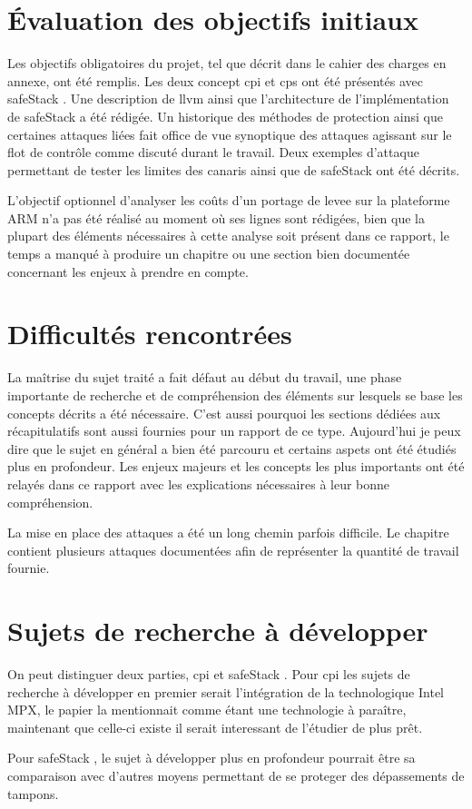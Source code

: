\section{Évaluation des objectifs initiaux}

Les objectifs obligatoires du projet, tel que décrit dans le cahier des charges en
annexe, ont été remplis. Les deux concept \gls{cpi} et \gls{cps} ont été présentés
avec \og \gls{safeStack} \fg. Une description de \gls{llvm} ainsi que l'architecture
de l'implémentation de \og \gls{safeStack} \fg a été rédigée. Un historique des
méthodes de protection ainsi que certaines attaques liées fait office de vue
synoptique des attaques agissant sur le flot de contrôle comme discuté durant
le travail. Deux exemples d'attaque permettant de tester les limites des canaris
ainsi que de \og \gls{safeStack} \fg ont été décrits.

L'objectif optionnel d'analyser les coûts d'un portage de \gls{levee} sur la plateforme
ARM n'a pas été réalisé au moment où ses lignes sont rédigées, bien que la plupart
des éléments nécessaires à cette analyse soit présent dans ce rapport, le temps
a manqué à produire un chapitre ou une section bien documentée concernant les
enjeux à prendre en compte.

\section{Difficultés rencontrées}

La maîtrise du sujet traité a fait défaut au début du travail, une phase importante
de recherche et de compréhension des éléments sur lesquels se base les
concepts décrits a été nécessaire. C'est aussi pourquoi les sections dédiées aux
récapitulatifs sont aussi fournies pour un rapport de ce type. Aujourd'hui je peux
dire que le sujet en général a bien été parcouru et certains aspets ont été
étudiés plus en profondeur. Les enjeux majeurs et les concepts les plus importants
ont été relayés dans ce rapport avec les explications nécessaires à leur bonne
compréhension.

La mise en place des attaques a été un long chemin parfois difficile. Le chapitre
contient plusieurs attaques documentées afin de représenter la quantité de travail
fournie.

\section{Sujets de recherche à développer}

On peut distinguer deux parties, \gls{cpi} et \og \gls{safeStack} \fg.
Pour \gls{cpi} les sujets de recherche à développer en premier serait l'intégration
de la technologique Intel MPX, le papier la mentionnait comme étant une technologie
à paraître, maintenant que celle-ci existe il serait interessant de l'étudier de
plus prêt.

Pour \og \gls{safeStack} \fg, le sujet à développer plus en profondeur pourrait
être sa comparaison avec d'autres moyens permettant de se proteger des dépassements
de tampons.

